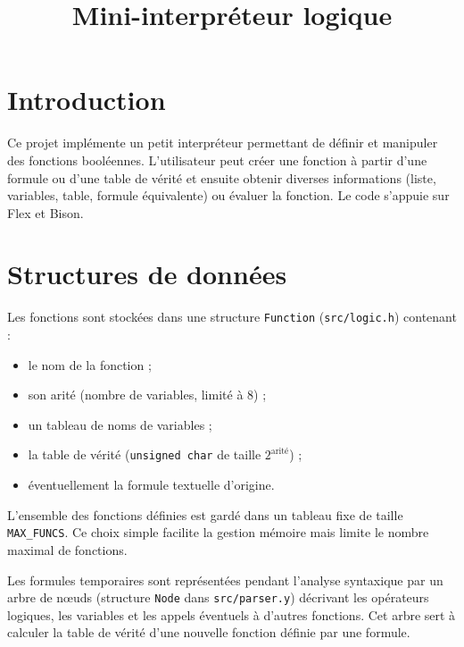 \documentclass[11pt,a4paper]{article}
\title{Mini-interpréteur logique}
\date{}
\begin{document}
\maketitle
\section*{Introduction}
Ce projet implémente un petit interpréteur permettant de définir et manipuler des fonctions booléennes. L'utilisateur peut créer une fonction à partir d'une formule ou d'une table de vérité et ensuite obtenir diverses informations (liste, variables, table, formule équivalente) ou évaluer la fonction. Le code s'appuie sur Flex et Bison.

\section*{Structures de données}
Les fonctions sont stockées dans une structure \texttt{Function} (\texttt{src/logic.h}) contenant :
\begin{itemize}
  \item le nom de la fonction ;
  \item son arité (nombre de variables, limité à 8) ;
  \item un tableau de noms de variables ;
  \item la table de vérité (\texttt{unsigned char} de taille $2^{\text{arité}}$) ;
  \item éventuellement la formule textuelle d'origine.
\end{itemize}
L'ensemble des fonctions définies est gardé dans un tableau fixe de taille \texttt{MAX\_FUNCS}. Ce choix simple facilite la gestion mémoire mais limite le nombre maximal de fonctions.

Les formules temporaires sont représentées pendant l'analyse syntaxique par un arbre de nœuds (structure \texttt{Node} dans \texttt{src/parser.y}) décrivant les opérateurs logiques, les variables et les appels éventuels à d'autres fonctions. Cet arbre sert à calculer la table de vérité d'une nouvelle fonction définie par une formule.
\end{document}
